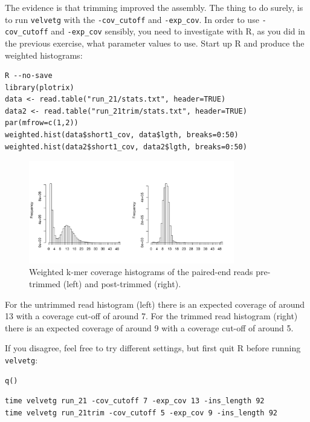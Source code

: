 \begin{steps}
The evidence is that trimming improved the assembly. The thing to do surely, is
to run \texttt{velvetg} with the \texttt{-cov\_cutoff} and \texttt{-exp\_cov}. In order
to use \texttt{-cov\_cutoff} and \texttt{-exp\_cov} sensibly, you need to
investigate with R, as you did in the previous exercise, what parameter values
to use. Start up R and produce the weighted histograms:
\begin{lstlisting}[style=R]
R --no-save
library(plotrix) 
data <- read.table("run_21/stats.txt", header=TRUE) 
data2 <- read.table("run_21trim/stats.txt", header=TRUE) 
par(mfrow=c(1,2))
weighted.hist(data$short1_cov, data$lgth, breaks=0:50)
weighted.hist(data2$short1_cov, data2$lgth, breaks=0:50)
\end{lstlisting}

\begin{figure}[H]
\centering
\includegraphics[width=0.8\textwidth]{de_novo/velvet/velvet_Rplot002.png}
\caption{\label{fig:velvet_Rplot002} Weighted k-mer coverage histograms of the paired-end reads pre-trimmed (left) and post-trimmed (right).}
\end{figure}

For the untrimmed read histogram (left) there is an expected coverage of around
13 with a coverage cut-off of around 7. For the trimmed read histogram (right)
there is an expected coverage of around 9 with a coverage cut-off of around 5.

If you disagree, feel free to try different settings, but first quit R before
running \texttt{velvetg}:
\begin{lstlisting}[style=R]
q()
\end{lstlisting}

\begin{lstlisting}
time velvetg run_21 -cov_cutoff 7 -exp_cov 13 -ins_length 92
time velvetg run_21trim -cov_cutoff 5 -exp_cov 9 -ins_length 92
\end{lstlisting}

\end{steps}

